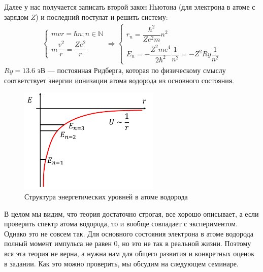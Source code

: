 \documentclass[12pt]{article}
\begin{document}
\noindent
Далее у нас получается записать второй закон Ньютона (для электрона в атоме с зарядом $Z$) и последний постулат и решить систему:
\begin{gather*}
    \begin{cases}
     mvr = \hbar n; n\in \mathbb{N}\\[10pt]
     m\dfrac{v^2}{r} = \dfrac{Ze^2}{r}
     \end{cases}
     \Rightarrow
     \begin{cases}
     r_n = \dfrac{\hbar^2}{Ze^2m}n^2\\[10pt]
     E_n = -\dfrac{Z^2me^4}{2\hbar^2} \dfrac{1}{n^2} = -Z^2 Ry\dfrac{1}{n^2}
     \end{cases}
\end{gather*}
$Ry = 13.6$ эВ --- постоянная Ридберга, которая по физическому смыслу соответствует энергии ионизации атома водорода из основного состояния.

\begin{figure}[h]
    \centering
    \includegraphics[width=0.6\textwidth,height=\textheight,keepaspectratio]{Seminar_06/pics/pic_02.pdf}
    \caption{Структура энергетических уровней в атоме водорода}
    \label{fig:sem_04_H_energy_levels}
\end{figure}

\vspace{1em} \noindent
В целом мы видим, что теория достаточно строгая, все хорошо описывает, а если проверить спектр атома водорода, то и вообще совпадает с экспериментом. Однако это не совсем так. Для основного состояния электрона в атоме водорода полный момент импульса не равен 0, но это не так в реальной жизни. Поэтому вся эта теория не верна, а нужна нам для общего развития и конкретных оценок в задании. Как это можно проверить, мы обсудим на следующем семинаре. 
\end{document}

